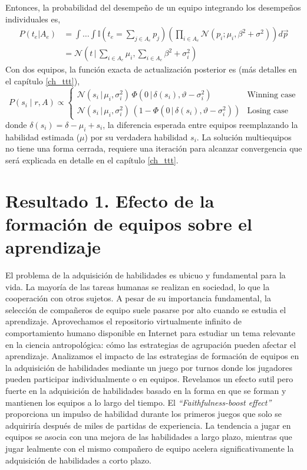 \documentclass[a4paper,11pt]{book}
\newcommand{\N}{\mathcal{N}}
\theoremstyle{definition}
\begin{document}
Entonces, la probabilidad del desempe\~no de un equipo integrando los desempe\~nos individuales es,
\begin{align}
 P(t_e|A_e) &= \int \dots \int \mathbb{I}(t_e = \sum_{j\in A_e } p_j ) \left(\prod_{i \in A_e} \N(p_i;\mu_i,\beta^2 + \sigma^2) \right) d\vec{p} \\
 & = \N\left(t\,|\,\sum_{i\in A_e} \mu_i,\sum_{i\in A_e} \beta^2 + \sigma_i^2\right)
\end{align}
%
Con dos equipos, la funci\'on exacta de actualizaci\'on posterior es (m\'as detalles en el cap\'itulo \ref{ch_ttt}),
%
\begin{equation}
 P(s_i \mid r, A) \propto
 \begin{cases}
  \N(s_i \, | \, \mu_i, \sigma_i^2) \, \Phi(0 \, | \, \delta(s_i), \vartheta - \sigma_i^2) & \text{Winning case} \\
  \N(s_i \, | \, \mu_i, \sigma_i^2 ) \, (1 - \Phi(0 \, | \, \delta(s_i), \vartheta - \sigma_i^2)) & \text{Losing case}
 \end{cases}
\end{equation}
%
donde $\delta(s_i) = \delta - \mu_i + s_i$, la diferencia esperada entre equipos reemplazando la habilidad estimada ($\mu$) por su verdadera habilidad $s_i$.
%
La soluci\'on multiequipos no tiene una forma cerrada, requiere una iteraci\'on para alcanzar convergencia que ser\'a explicada en detalle en el cap\'itulo \ref{ch_ttt}.












\chapter{Resultado 1. Efecto de la formaci\'on de equipos sobre el aprendizaje}\label{ch_team}

El problema de la adquisici\'on de habilidades es ubicuo y fundamental para la vida.
%
La mayor\'ia de las tareas humanas se realizan en sociedad, lo que  la cooperaci\'on con otros sujetos.
%
A pesar de su importancia fundamental, la selecci\'on de compa\~neros de equipo suele pasarse por alto cuando se estudia el aprendizaje.
%
Aprovechamos el repositorio virtualmente infinito de comportamiento humano disponible en Internet para estudiar un tema relevante en la ciencia antropol\'ogica: c\'omo las estrategias de agrupaci\'on pueden afectar el aprendizaje.
%
Analizamos el impacto de las estrategias de formaci\'on de equipos en la adquisici\'on de habilidades mediante un juego por turnos donde los jugadores pueden participar individualmente o en equipos.
%
Revelamos un efecto sutil pero fuerte en la adquisici\'on de habilidades basado en la forma en que se forman y mantienen los equipos a lo largo del tiempo.
%
El \emph{``Faithfulness-boost effect''} proporciona un impulso de habilidad durante los primeros juegos que solo se adquirir\'ia despu\'es de miles de partidas de experiencia.
%
La tendencia a jugar en equipos se asocia con una mejora de las habilidades a largo plazo, mientras que jugar lealmente con el mismo compa\~nero de equipo acelera significativamente la adquisici\'on de habilidades a corto plazo.
\end{document}
